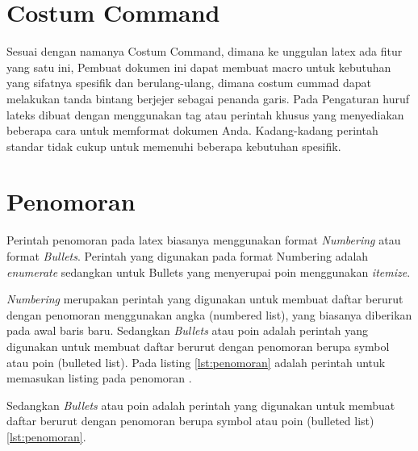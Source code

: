\section{Costum Command}
Sesuai  dengan  namanya Costum Command, dimana ke unggulan latex ada fitur yang satu ini, Pembuat dokumen ini dapat  membuat macro untuk kebutuhan yang sifatnya spesifik dan berulang-ulang, dimana costum cummad dapat melakukan tanda bintang berjejer sebagai penanda garis. Pada Pengaturan huruf lateks dibuat dengan menggunakan tag atau perintah khusus yang menyediakan beberapa cara untuk memformat dokumen Anda. Kadang-kadang perintah standar tidak cukup untuk memenuhi beberapa kebutuhan spesifik.

\section{Penomoran}
Perintah penomoran pada latex biasanya menggunakan format \textit{Numbering} atau format \textit{Bullets}. Perintah yang digunakan pada format Numbering adalah \textit{enumerate} sedangkan untuk Bullets yang menyerupai poin menggunakan \textit{itemize}.



\textit{Numbering} merupakan perintah yang digunakan untuk membuat daftar berurut dengan penomoran menggunakan angka (numbered list), yang biasanya diberikan pada awal baris baru. Sedangkan \textit{Bullets} atau poin adalah perintah yang digunakan untuk membuat daftar berurut dengan penomoran berupa symbol atau poin (bulleted list). Pada listing \ref{lst:penomoran} adalah perintah untuk memasukan listing pada penomoran .



Sedangkan \textit{Bullets} atau poin adalah perintah yang digunakan untuk membuat daftar berurut dengan penomoran berupa symbol atau poin (bulleted list) \ref{lst:penomoran}.



